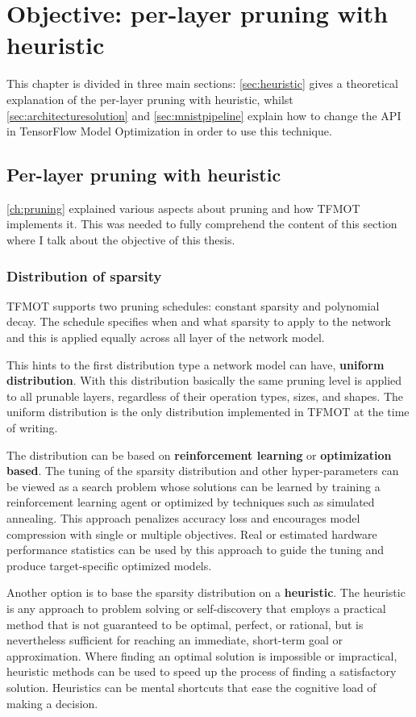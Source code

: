 \chapter{Objective: per-layer pruning with heuristic}\label{ch:objective}
This chapter is divided in three main sections: \autoref{sec:heuristic} gives a
theoretical explanation of the per-layer pruning with heuristic, whilst
\autoref{sec:architecturesolution} and \autoref{sec:mnistpipeline} explain how
to change the API in TensorFlow Model Optimization in order to use this
technique.

\section{Per-layer pruning with heuristic}\label{sec:heuristic}
\autoref{ch:pruning} explained various aspects about pruning and how TFMOT
implements it. This was needed to fully comprehend the content of this section
where I talk about the objective of this thesis.

\subsection{Distribution of sparsity}
TFMOT supports two pruning schedules: constant sparsity and polynomial decay.
The schedule specifies when and what sparsity to apply to the network and this
is applied equally across all layer of the network model.

This hints to the first distribution type a network model can have,
\textbf{uniform distribution}. With this distribution basically the same
pruning level is applied to all prunable layers, regardless of their operation
types, sizes, and shapes.
The uniform distribution is the only distribution implemented in TFMOT at the
time of writing.

The distribution can be based on \textbf{reinforcement learning} or
\textbf{optimization based}. The tuning of the sparsity distribution and other
hyper-parameters can be viewed as a search problem whose solutions can be
learned\cite{He_2018} by training a reinforcement learning agent or optimized
by techniques such as simulated annealing. This approach penalizes accuracy
loss and encourages model compression with single or multiple objectives.
Real or estimated hardware performance statistics can be used by this approach
to guide the tuning and produce target-specific optimized models.

Another option is to base the sparsity distribution on a \textbf{heuristic}.
The heuristic is any approach to problem solving or self-discovery that employs
a practical method that is not guaranteed to be optimal, perfect, or rational,
but is nevertheless sufficient for reaching an immediate, short-term goal or
approximation.
Where finding an optimal solution is impossible or impractical, heuristic
methods can be used to speed up the process of finding a satisfactory solution.
Heuristics can be mental shortcuts that ease the cognitive load of making a
decision.\cite{heuristic}

